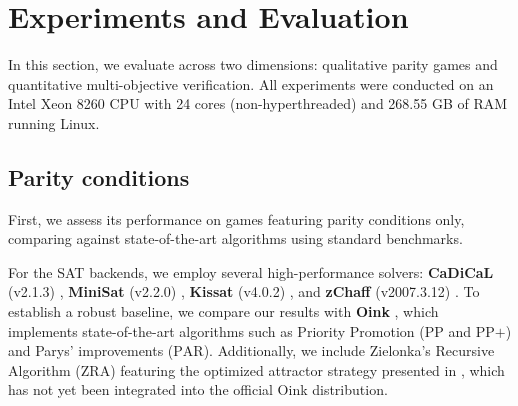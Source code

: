 \documentclass[a4paper,UKenglish,cleveref, autoref, thm-restate, anonymous]{lipics-v2021}
\begin{document}





\section{Experiments and Evaluation}\label{sec:experiments}

In this section, we evaluate \nocq across two dimensions: qualitative parity games and quantitative multi-objective verification. All experiments were conducted on an Intel Xeon 8260 CPU with 24 cores (non-hyperthreaded) and 268.55 GB of RAM running Linux.


\subsection{Parity conditions}

First, we assess its performance on games featuring parity conditions only, comparing \nocq against state-of-the-art algorithms using standard benchmarks.

For the SAT backends, we employ several high-performance solvers: \textbf{CaDiCaL} (v2.1.3) \cite{Biere:Cadical:2024}, \textbf{MiniSat} (v2.2.0) \cite{Een:MiniSat:2003}, \textbf{Kissat} (v4.0.2) \cite{Biere:Kissat:2024}, and \textbf{zChaff} (v2007.3.12) \cite{Moskewicz:zChaff:2001}. To establish a robust baseline, we compare our results with \textbf{Oink} \cite{vanDijk:2018}, which implements state-of-the-art algorithms such as Priority Promotion ($\text{PP}$ and $\text{PP+}$) and Parys' improvements ($\text{PAR}$). Additionally, we include Zielonka's Recursive Algorithm ($\text{ZRA}$) featuring the optimized attractor strategy presented in \cite{Aggarwal:2023}, which has not yet been integrated into the official Oink distribution.
\end{document}
